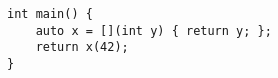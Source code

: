 \begin{lstlisting}[title=\href{https://godbolt.org/z/963TMh}{\texttt{godbolt.org/z/963TMh}}]
int main() {
    auto x = [](int y) { return y; };
    return x(42);
}
\end{lstlisting}
